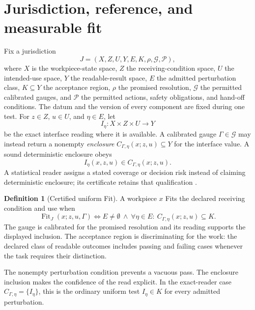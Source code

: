 \documentclass[11pt,letterpaper]{article}
\theoremstyle{definition}\newtheorem{definition}{Definition}
\newcommand{\Fit}{\operatorname{Fit}}
\begin{document}
\section{Jurisdiction, reference, and measurable fit}
Fix a jurisdiction
\begin{equation}\label{eq:jurisdiction}
J=(X,Z,U,Y,E,K,\rho,\mathcal G,\mathcal P),
\end{equation}
where $X$ is the workpiece-state space, $Z$ the receiving-condition space, $U$ the intended-use space, $Y$ the readable-result space, $E$ the admitted perturbation class, $K\subseteq Y$ the acceptance region, $\rho$ the promised resolution, $\mathcal G$ the permitted calibrated gauges, and $\mathcal P$ the permitted actions, safety obligations, and hand-off conditions. The datum and the version of every component are fixed during one test. For $z\in Z$, $u\in U$, and $\eta\in E$, let
\begin{equation}\label{eq:read}
I_\eta:X\times Z\times U\longrightarrow Y
\end{equation}
be the exact interface reading where it is available. A calibrated gauge $\Gamma\in\mathcal G$ may instead return a nonempty \emph{enclosure} $C_{\Gamma,\eta}(x;z,u)\subseteq Y$ for the interface value. A sound deterministic enclosure obeys
\begin{equation}\label{eq:sound}
I_\eta(x,z,u)\in C_{\Gamma,\eta}(x;z,u).
\end{equation}
A statistical reader assigns a stated coverage or decision risk instead of claiming deterministic enclosure; its certificate retains that qualification \cite{gum,conformity}.

\begin{definition}[Certified uniform Fit]\label{def:fit}
A workpiece $x$ Fits the declared receiving condition and use when
\begin{equation}\label{eq:fit}
\boxed{\Fit_J(x;z,u,\Gamma)\iff
E\ne\emptyset\ \land\
\forall\eta\in E:\ C_{\Gamma,\eta}(x;z,u)\subseteq K.}
\end{equation}
The gauge is calibrated for the promised resolution and its reading supports the displayed inclusion. The acceptance region is discriminating for the work: the declared class of readable outcomes includes passing and failing cases whenever the task requires their distinction.
\end{definition}
The nonempty perturbation condition prevents a vacuous pass. The enclosure inclusion makes the confidence of the read explicit. In the exact-reader case $C_{\Gamma,\eta}=\{I_\eta\}$, this is the ordinary uniform test $I_\eta\in K$ for every admitted perturbation.
\end{document}
